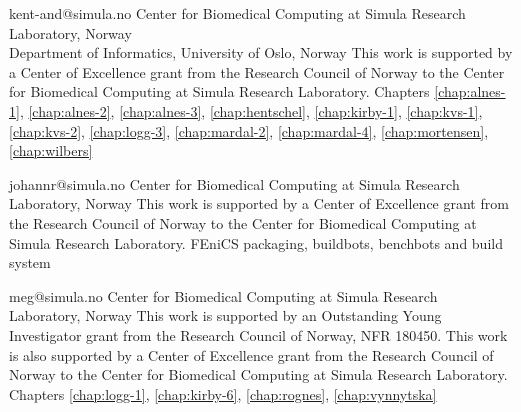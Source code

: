 

             {kent-and@simula.no}
             {Center for Biomedical Computing at Simula Research Laboratory, Norway \\
              Department of Informatics, University of Oslo, Norway}
             {This work is supported by a Center of Excellence grant
              from the Research Council of Norway to the Center for
              Biomedical Computing at Simula Research Laboratory.}
             {Chapters
              \ref{chap:alnes-1}, \ref{chap:alnes-2}, \ref{chap:alnes-3},
              \ref{chap:hentschel}, \ref{chap:kirby-1}, \ref{chap:kvs-1},
              \ref{chap:kvs-2}, \ref{chap:logg-3}, \ref{chap:mardal-2},
              \ref{chap:mardal-4}, \ref{chap:mortensen}, \ref{chap:wilbers}}






             {johannr@simula.no}
             {Center for Biomedical Computing at Simula Research Laboratory, Norway}
             {This work is supported by a Center of Excellence grant
              from the Research Council of Norway to the Center for
              Biomedical Computing at Simula Research Laboratory.}
             {FEniCS packaging, buildbots, benchbots and build system}

             {meg@simula.no}
             {Center for Biomedical Computing at Simula Research Laboratory, Norway}
             {This work is supported by an Outstanding Young
              Investigator grant from the Research Council of Norway,
              NFR 180450. This work is also supported by a Center of
              Excellence grant from the Research Council of Norway to
              the Center for Biomedical Computing at Simula Research
              Laboratory.}
             {Chapters
              \ref{chap:logg-1}, \ref{chap:kirby-6}, \ref{chap:rognes}, \ref{chap:vynnytska}}


